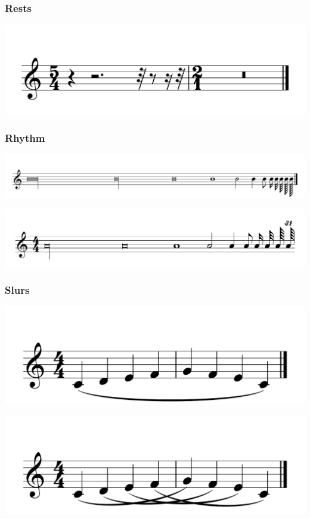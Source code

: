 \documentclass{article}
\begin{document}
\subsubsection{Rests}
\includegraphics[scale=0.5]{figures_tests/pdf/skern/rest1.pdf}

\subsubsection{Rhythm}
\includegraphics[scale=0.3]{figures_tests/pdf/skern/rhythm.pdf}

\includegraphics[scale=0.3]{figures_tests/pdf/skern/time.pdf}

\subsubsection{Slurs}
\includegraphics[scale=0.5]{figures_tests/pdf/skern/slur1.pdf}

\includegraphics[scale=0.5]{figures_tests/pdf/skern/slur2.pdf}
\end{document}
